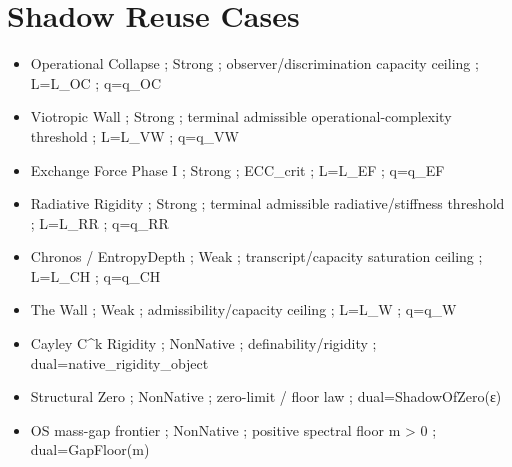 \section*{Shadow Reuse Cases}
\begin{itemize}
\item Operational Collapse ; Strong ; observer/discrimination capacity ceiling ; L=L\_OC ; q=q\_OC
\item Viotropic Wall ; Strong ; terminal admissible operational-complexity threshold ; L=L\_VW ; q=q\_VW
\item Exchange Force Phase I ; Strong ; ECC\_crit ; L=L\_EF ; q=q\_EF
\item Radiative Rigidity ; Strong ; terminal admissible radiative/stiffness threshold ; L=L\_RR ; q=q\_RR
\item Chronos / EntropyDepth ; Weak ; transcript/capacity saturation ceiling ; L=L\_CH ; q=q\_CH
\item The Wall ; Weak ; admissibility/capacity ceiling ; L=L\_W ; q=q\_W
\item Cayley C^k Rigidity ; NonNative ; definability/rigidity ; dual=native\_rigidity\_object
\item Structural Zero ; NonNative ; zero-limit / floor law ; dual=ShadowOfZero(ε)
\item OS mass-gap frontier ; NonNative ; positive spectral floor m > 0 ; dual=GapFloor(m)
\end{itemize}
